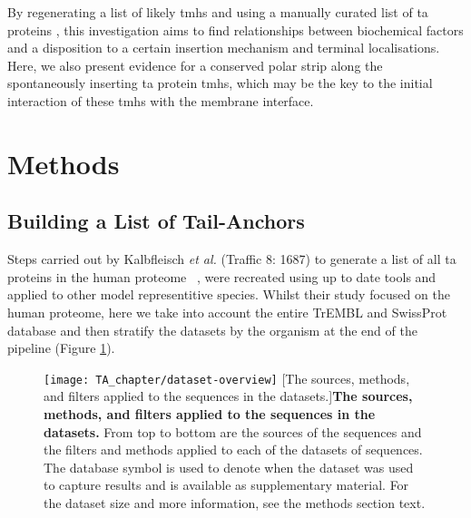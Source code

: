 By regenerating a list of likely \gls{tmh}s \cite{Kalbfleisch2007} and using a manually curated list of \gls{ta} proteins \cite{TheUniProtConsortium2014}, this investigation aims to find relationships between biochemical factors and a disposition to a certain insertion mechanism and terminal localisations.
Here, we also present evidence for a conserved polar strip along the spontaneously inserting \gls{ta} protein \gls{tmh}s, which may be the key to the initial interaction of these \gls{tmh}s with the membrane interface.

\section{Methods}

\subsection{Building a List of Tail-Anchors}
Steps carried out by Kalbfleisch \textit{et al.} (Traffic 8: 1687) to generate a list of all \gls{ta} proteins in the human proteome ~\cite{Kalbfleisch2007}, were recreated using up to date tools and applied to other model representitive species.
Whilst their study focused on the human proteome, here we take into account the entire TrEMBL and SwissProt database and then stratify the datasets by the organism at the end of the pipeline (Figure \ref{fig:dataset-overview}).

\begin{figure}[!ht]
\centering
\texttt{[image: TA\_chapter/dataset-overview]}
        [The sources, methods, and filters applied to the sequences in the datasets.]{\textbf{The sources, methods, and filters applied to the sequences in the datasets.}
        From top to bottom are the sources of the sequences and the filters and methods applied to each of the datasets of sequences. The database symbol is used to denote when the dataset was used to capture results and is available as supplementary material. For the dataset size and more information, see the methods section text.
}

\label{fig:dataset-overview}
\end{figure}

